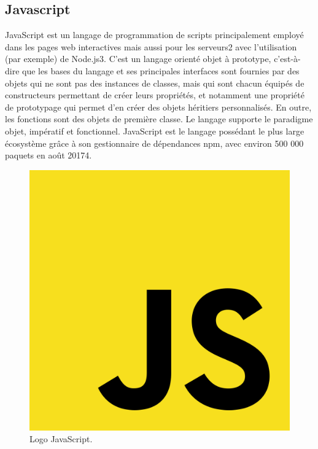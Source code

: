 \documentclass[12pt,a4paper]{report}
\begin{document}
\subsection{Javascript}
JavaScript est un langage de programmation de scripts principalement employé dans les pages web interactives mais aussi pour les serveurs2 avec l'utilisation (par exemple) de Node.js3. C'est un langage orienté objet à prototype, c'est-à-dire que les bases du langage et ses principales interfaces sont fournies par des objets qui ne sont pas des instances de classes, mais qui sont chacun équipés de constructeurs permettant de créer leurs propriétés, et notamment une propriété de prototypage qui permet d'en créer des objets héritiers personnalisés. En outre, les fonctions sont des objets de première classe. Le langage supporte le paradigme objet, impératif et fonctionnel. JavaScript est le langage possédant le plus large écosystème grâce à son gestionnaire de dépendances npm, avec environ 500 000 paquets en août 20174.
\begin{figure}[H]
	\centering
	\includegraphics[width=0.3\linewidth]{js}
	\caption{Logo JavaScript.}
	
\end{figure}
\end{document}
